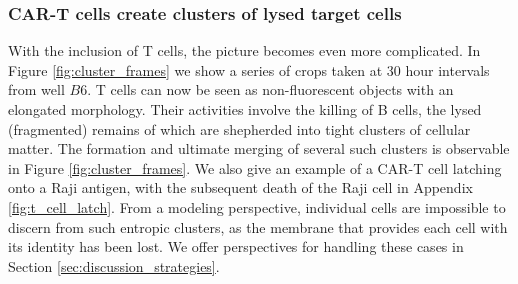 \subsubsection{CAR-T cells create clusters of lysed target cells}


With the inclusion of T cells, the picture becomes even more complicated. In Figure \ref{fig:cluster_frames} we show a series of crops taken at 30 hour intervals from well $B6$. T cells can now be seen as non-fluorescent objects with an elongated morphology. Their activities involve the killing of B cells, the lysed (fragmented) remains of which are shepherded into tight clusters of cellular matter. The formation and ultimate merging of several such clusters is observable in Figure \ref{fig:cluster_frames}. We also give an example of a CAR-T cell latching onto a Raji antigen, with the subsequent death of the Raji cell in Appendix \ref{fig:t_cell_latch}. From a modeling perspective, individual cells are impossible to discern from such entropic clusters, as the membrane that provides each cell with its identity has been lost. We offer perspectives for handling these cases in Section \ref{sec:discussion_strategies}.

